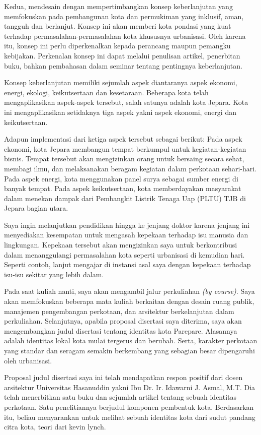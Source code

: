 \documentclass[../main.tex]{subfiles}
\begin{document}
Kedua, mendesain dengan mempertimbangkan  konsep keberlanjutan yang memfokuskan pada pembangunan kota dan permukiman yang inklusif, aman, tangguh dan berlanjut.
Konsep ini akan memberi kota pondasi yang kuat terhadap permasalahan-permasalahan kota khususnya urbanisasi. Oleh karena itu, konsep ini perlu diperkenalkan kepada perancang maupun pemangku kebijakan. Perkenalan konsep ini dapat melalui penulisan artikel, penerbitan buku, bahkan pembahasan dalam seminar tentang pentingnya keberlanjutan.

Konsep keberlanjutan memiliki sejumlah aspek diantaranya aspek ekonomi, energi, ekologi, keikutsertaan dan kesetaraan. Beberapa kota telah mengaplikasikan aspek-aspek tersebut, salah satunya adalah kota Jepara. Kota ini mengaplikasikan setidaknya tiga aspek yakni aspek ekonomi, energi dan keikutsertaan.

Adapun implementasi dari ketiga aspek tersebut sebagai berikut: Pada aspek ekonomi, kota Jepara membangun tempat berkumpul untuk kegiatan-kegiatan bisnis. Tempat tersebut akan mengizinkan orang untuk bersaing secara sehat, membagi ilmu, dan melaksanakan beragam kegiatan dalam perkotaan sehari-hari.
Pada aspek energi, kota menggunakan panel surya sebagai sumber energi di banyak tempat.
Pada aspek keikutsertaan, kota memberdayakan masyarakat dalam menekan dampak dari Pembangkit Listrik Tenaga Uap (PLTU) TJB di Jepara bagian utara.

Saya ingin melanjutkan pendidikan hingga ke jenjang doktor karena jenjang ini menyediakan kesempatan untuk mengasah kepekaan terhadap isu manusia dan lingkungan.
Kepekaan tersebut akan mengizinkan saya untuk berkontribusi dalam menanggulangi permasalahan kota seperti urbanisasi di kemudian hari.
Seperti contoh, lanjut mengajar di instansi asal saya dengan kepekaan terhadap isu-isu sekitar yang lebih dalam.

Pada saat kuliah nanti, saya akan mengambil jalur perkuliahan \textit{(by course)}.
Saya akan memfokuskan beberapa mata kuliah berkaitan dengan desain ruang publik, manajemen pengembangan perkotaan, dan arsitektur berkelanjutan dalam perkuliahan.
Selanjutnya, apabila proposal disertasi saya diterima, saya akan mengembangkan judul disertasi tentang identitas kota Parepare.
Alasannya adalah identitas lokal kota mulai tergerus dan berubah.
Serta, karakter perkotaan yang standar dan seragam semakin berkembang yang sebagian besar dipengaruhi oleh urbanisasi.

Proposal judul disertasi saya ini telah mendapatkan respon positif dari dosen arsitektur Universitas Hasanuddin yakni Ibu Dr. Ir. Idawarni J. Asmal, M.T. Dia telah menerbitkan satu buku dan sejumlah artikel tentang sebuah identitas perkotaan. Satu penelitiannya berjudul komponen pembentuk kota.
Berdasarkan itu, beliau menyarankan untuk melihat sebuah identitas kota dari sudut pandang citra kota, teori dari kevin lynch.
\end{document}
